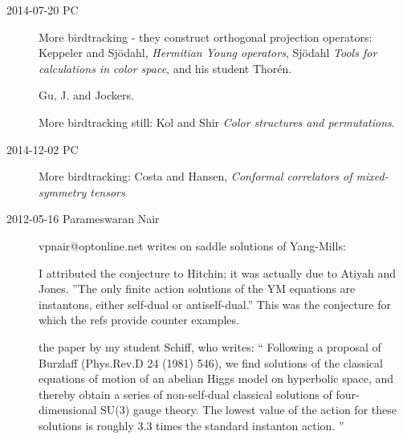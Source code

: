 \begin{description}
\item[2014-07-20 PC] More birdtracking - they construct orthogonal
projection operators: Keppeler and
    Sj{\"o}dahl, {\em Hermitian {Young} operators},
    Sj{\"o}dahl {\em Tools for calculations in
    color space}, and his student Thor{\'e}n.

Gu, J. and Jockers.

More birdtracking still:
Kol and Shir {\em Color structures and permutations}.

\item[2014-12-02 PC] More birdtracking:
Costa and Hansen,
{\em Conformal correlators of mixed-symmetry tensors}

\item[2012-05-16  Parameswaran Nair]  vpnair@optonline.net writes
on saddle solutions of Yang-Mills:

I attributed the conjecture to Hitchin; it was actually due to Atiyah and
Jones. ''The only finite action solutions of the YM equations are
instantons, either self-dual or antiself-dual.'' This was the conjecture
for which the refs provide counter examples.

 the paper by my
student Schiff, who writes:
``
Following a proposal of Burzlaff (Phys.Rev.D 24 (1981) 546), we find
solutions of the classical equations of motion of an abelian Higgs model
on hyperbolic space, and thereby obtain a series of non-self-dual
classical solutions of four-dimensional SU(3) gauge theory. The lowest
value of the action for these solutions is roughly 3.3 times the standard
instanton action.
''


\end{description}
